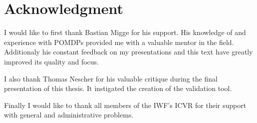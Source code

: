 \chapter*{Acknowledgment}

I would like to first thank Bastian Migge for his support. His knowledge of and experience with POMDPs provided me with a valuable mentor in the field. Additionaly his constant feedback on my presentations and this text have greatly improved its quality and focus.

I also thank Thomas Nescher for his valuable critique during the final presentation of this thesis. It instigated the creation of the validation tool.

Finally I would like to thank all members of the IWF's ICVR for their support with general and administrative problems.